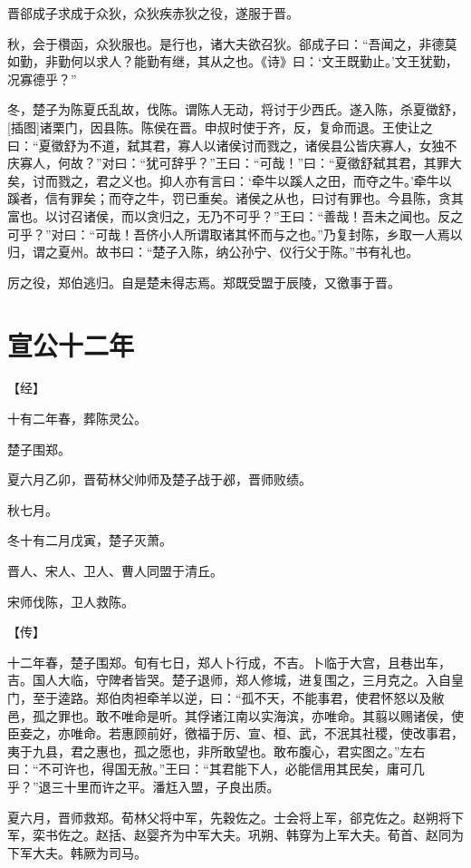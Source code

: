 \documentclass[a4paper,12pt,UTF8,twoside]{ctexbook}
\begin{document}
晋郤成子求成于众狄，众狄疾赤狄之役，遂服于晋。

秋，会于欑函，众狄服也。是行也，诸大夫欲召狄。郤成子曰：“吾闻之，非德莫如勤，非勤何以求人？能勤有继，其从之也。《诗》曰：‘文王既勤止。’文王犹勤，况寡德乎？”

冬，楚子为陈夏氏乱故，伐陈。谓陈人无动，将讨于少西氏。遂入陈，杀夏徵舒，[插图]诸栗门，因县陈。陈侯在晋。申叔时使于齐，反，复命而退。王使让之曰：“夏徵舒为不道，弑其君，寡人以诸侯讨而戮之，诸侯县公皆庆寡人，女独不庆寡人，何故？”对曰：“犹可辞乎？”王曰：“可哉！”曰：“夏徵舒弑其君，其罪大矣，讨而戮之，君之义也。抑人亦有言曰：‘牵牛以蹊人之田，而夺之牛。’牵牛以蹊者，信有罪矣；而夺之牛，罚已重矣。诸侯之从也，曰讨有罪也。今县陈，贪其富也。以讨召诸侯，而以贪归之，无乃不可乎？”王曰：“善哉！吾未之闻也。反之可乎？”对曰：“可哉！吾侪小人所谓取诸其怀而与之也。”乃复封陈，乡取一人焉以归，谓之夏州。故书曰：“楚子入陈，纳公孙宁、仪行父于陈。”书有礼也。

厉之役，郑伯逃归。自是楚未得志焉。郑既受盟于辰陵，又徼事于晋。


\chapter{宣公十二年}


【经】

十有二年春，葬陈灵公。

楚子围郑。

夏六月乙卯，晋荀林父帅师及楚子战于邲，晋师败绩。

秋七月。

冬十有二月戊寅，楚子灭萧。

晋人、宋人、卫人、曹人同盟于清丘。

宋师伐陈，卫人救陈。

【传】

十二年春，楚子围郑。旬有七日，郑人卜行成，不吉。卜临于大宫，且巷出车，吉。国人大临，守陴者皆哭。楚子退师，郑人修城，进复围之，三月克之。入自皇门，至于逵路。郑伯肉袒牵羊以逆，曰：“孤不天，不能事君，使君怀怒以及敝邑，孤之罪也。敢不唯命是听。其俘诸江南以实海滨，亦唯命。其翦以赐诸侯，使臣妾之，亦唯命。若惠顾前好，徼福于厉、宣、桓、武，不泯其社稷，使改事君，夷于九县，君之惠也，孤之愿也，非所敢望也。敢布腹心，君实图之。”左右曰：“不可许也，得国无赦。”王曰：“其君能下人，必能信用其民矣，庸可几乎？”退三十里而许之平。潘尪入盟，子良出质。

夏六月，晋师救郑。荀林父将中军，先穀佐之。士会将上军，郤克佐之。赵朔将下军，栾书佐之。赵括、赵婴齐为中军大夫。巩朔、韩穿为上军大夫。荀首、赵同为下军大夫。韩厥为司马。
\end{document}
